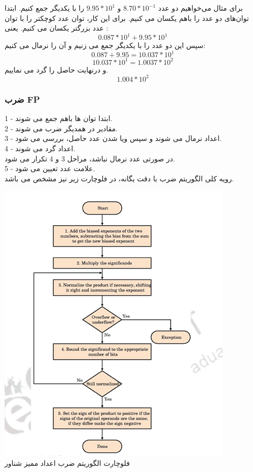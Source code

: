 \documentclass[12pt,titlepage,a4page , tikz , multi,table , svgnames,xcdraw]{article}
\begin{document}
برای مثال می‌خواهیم دو عدد 
$8.70 * 10^{-1}$
و 
$9.95*10^1$
را با یکدیگر جمع کنیم. ابتدا توان‌های دو عدد را باهم یکسان می کنیم. برای این کار، توان عدد کوچکتر را با توان عدد بزرگتر یکسان می کنیم. یعنی :
$$0.087*10^1 + 9.95*10^1$$
سپس این دو عدد را با یکدیگر جمع می زنیم و آن را نرمال می کنیم:
$$0.087 + 9.95 = 10.037 * 10^1$$
$$10.037*10^1 = 1.0037*10^2$$
و درنهایت حاصل را گرد می نماییم.
$$1.004 * 10^2$$

\cite{Floating_Point_Operationss} \cite{FPArithmatic}

\subsubsection{ضرب FP}
1 - ابتدا توان ها باهم جمع می شوند. \\
2 - مقادیر 
 در همدیگر ضرب می شوند. \\
3 - اعداد نرمال می شوند و سپس 
 ویا 
 شدن عدد حاصل، بررسی می شود. \\
4 - اعداد گرد می شوند. \\
در صورتی عدد نرمال نباشد، مراحل 3 و 4 تکرار می شود. \\
5 - علامت عدد تعیین می شود. \\
	رویه کلی الگوریتم ضرب 
     با دقت یگانه، در فلوچارت زیر نیز مشخص می باشد.

\begin{center}
\includegraphics[scale=0.8]
    {Images/Introduction/Floating_point_mult.png}\\
    \caption{فلوچارت الگوریتم ضرب اعداد ممیز شناور}
\end{center}
\end{document}
